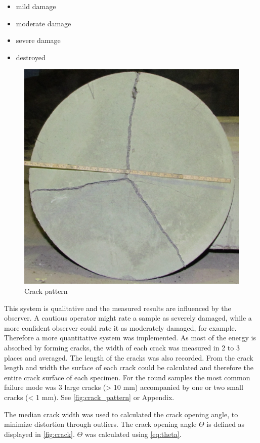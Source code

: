 \begin{itemize}
    \item mild damage
    \item moderate damage
    \item severe damage
    \item destroyed
\end{itemize}


\begin{figure}
    \centering
    \includegraphics[width = 0.45 \linewidth]{appendix/2018-12-04_Rfrs_50_0,3.JPG}
    \caption{Crack pattern}
    \label{fig:crack_pattern}
\end{figure}

This system is qualitative and the measured results are influenced by the observer. A cautious operator might rate a sample as severely damaged, while a more confident observer could rate it as moderately damaged, for example. Therefore a more quantitative system was implemented.
As most of the energy is absorbed by forming cracks, the width of each crack was measured in 2 to 3 places and averaged. The length of the cracks was also recorded. From the crack length and width the surface of each crack could be calculated and therefore the entire crack surface of each specimen. For the round samples the most common failure mode was 3 large cracks (> 10 mm) accompanied by one or two small cracks (< 1 mm). See \autoref{fig:crack_pattern} or Appendix.

The median crack width was used to calculated the crack opening angle, to minimize distortion through outliers. The crack opening angle \(\Theta\) is defined as displayed in \autoref{fig:crack}. \(\Theta\) was calculated using \autoref{eq:theta}.


